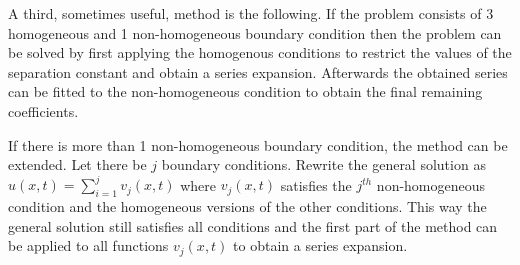     \begin{method}
		A third, sometimes useful, method is the following. If the problem consists of 3 homogeneous and 1 non-homogeneous boundary condition then the problem can be solved by first applying the homogenous conditions to restrict the values of the separation constant and obtain a series expansion. Afterwards the obtained series can be fitted to the non-homogeneous condition to obtain the final remaining coefficients.\par
        If there is more than 1 non-homogeneous boundary condition, the method can be extended. Let there be $j$ boundary conditions. Rewrite the general solution as $u(x, t) = \sum_{i=1}^jv_j(x, t)$ where $v_j(x, t)$ satisfies the $j^{th}$ non-homogeneous condition and the homogeneous versions of the other conditions. This way the general solution still satisfies all conditions and the first part of the method can be applied to all functions $v_j(x, t)$ to obtain a series expansion.
	\end{method}
    
